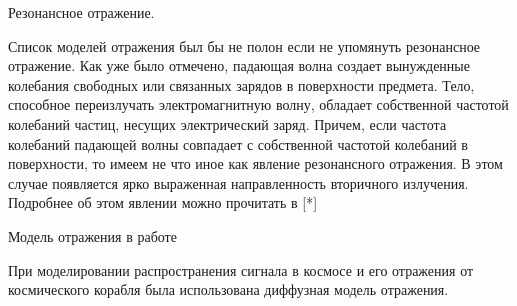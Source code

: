 Резонансное отражение.

Список моделей отражения был бы не полон если не упомянуть резонансное отражение. Как уже было отмечено, падающая волна создает вынужденные колебания свободных или связанных зарядов в поверхности предмета. Тело, способное переизлучать электромагнитную волну, обладает собственной частотой колебаний частиц, несущих электрический заряд. Причем, если частота колебаний падающей волны совпадает с собственной частотой колебаний в поверхности, то имеем не что иное как явление резонансного отражения. В этом случае появляется ярко выраженная направленность вторичного излучения. Подробнее об этом явлении можно прочитать в [*]

Модель отражения в работе

При моделировании распространения сигнала в космосе и его отражения от космического корабля была использована диффузная модель отражения.

